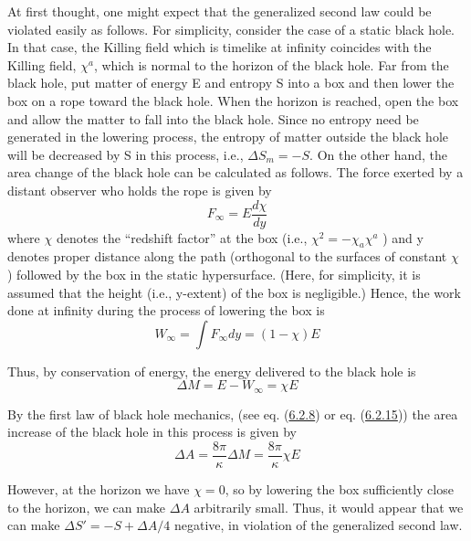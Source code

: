 \documentclass[11pt,a4paper]{article}
\begin{document}
At first thought, one might expect that the generalized second law could be violated easily as follows. For simplicity, consider the case of a static black hole. In that case, the Killing field which is timelike at infinity coincides with the Killing field, \(\chi^a\), which is normal to the horizon of the black hole. Far from the black hole, put matter of energy E and entropy S into a box and then lower the box on a rope toward the black hole. When the horizon is reached, open the box and allow the matter to fall into the black hole. Since no entropy need be generated in the lowering process, the entropy of matter outside the black hole will be decreased by S in this process, i.e., \(\Delta S_m = -S\). On the other hand, the area change of the black hole can be calculated as follows. The force exerted by a distant observer who holds the rope is given by
\begin{equation*}
F_\infty=E\frac{d\chi}{dy} \tag{7.2.6}\label{eq:7.2.6}
\end{equation*}
where \(\chi\) denotes the ``redshift factor'' at the box (i.e., \(\chi^2 = -\chi_a \chi^a\) ) and y denotes proper distance along the path (orthogonal to the surfaces of constant \(\chi\) ) followed by the box in the static hypersurface. (Here, for simplicity, it is assumed that the height (i.e., y-extent) of the box is negligible.) Hence, the work done at infinity during the process of lowering the box is
\begin{equation*}
W_{\infty} = \int F_{\infty} dy = (1 - \chi) E \tag{7.2.7}\label{eq:7.2.7}
\end{equation*}

Thus, by conservation of energy, the energy delivered to the black hole is
\begin{equation*}
\Delta M = E - W_{\infty} = \chi E \tag{7.2.8}\label{eq:7.2.8}
\end{equation*}

By the first law of black hole mechanics, (see eq. (\hyperref[eq:6.2.8]{6.2.8}) or eq. (\hyperref[eq:6.2.15]{6.2.15})) the area increase of the black hole in this process is given by
\begin{equation*}
\Delta A = \frac{8\pi}{\kappa} \Delta M = \frac{8\pi}{\kappa} \chi E \tag{7.2.9}\label{eq:7.2.9}
\end{equation*}

However, at the horizon we have \(\chi=0\), so by lowering the box sufficiently close to the horizon, we can make \(\Delta A\) arbitrarily small. Thus, it would appear that we can make \(\Delta S'=-S+\Delta A/4\) negative, in violation of the generalized second law.
\end{document}
